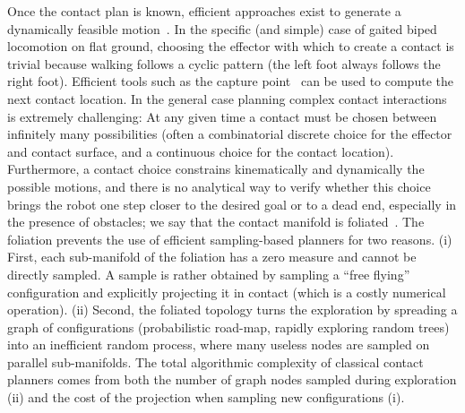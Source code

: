 Once the contact plan is known, efficient approaches exist to generate a dynamically feasible motion~\citep{Carpentier2016}.
In the specific (and simple) case of gaited biped locomotion on flat ground, 
choosing the effector with which to create a contact is trivial because walking follows a cyclic pattern (the left foot always follows the right foot).
Efficient tools such as the capture point~\citep{Pratt2006} can be used to compute the next contact location.
In the general case planning complex contact interactions is extremely challenging:
At any given time a contact must be chosen between infinitely many possibilities (often a combinatorial discrete choice for the effector and contact surface, and a continuous choice for the contact location). Furthermore, a contact choice constrains kinematically and dynamically the possible motions, and there is no analytical way to verify whether this choice brings the robot one step closer to the desired goal or to a dead end, especially in the presence of obstacles; we say that the contact manifold is foliated~\citep{simeon-manipulation-04}. 
The
foliation prevents the use of efficient sampling-based
planners
for two reasons. (i) First, each sub-manifold of the         
foliation
has
a zero measure and cannot be directly sampled.         
A
sample
is
rather obtained by sampling a “free flying”         
configuration
and
explicitly projecting it in contact (which is a         
costly
numerical
operation).
(ii) Second, the foliated topology       
turns
the
exploration
by
spreading
a graph of configurations        
(probabilistic
road-map,
rapidly
exploring
random trees) into      
an
inefficient
random
process,
where
many
useless nodes       
are
sampled
on
parallel
sub-manifolds.
The
total
algorithmic       
complexity
of
classical
contact
planners
comes
from
both the        
number
of
graph
nodes
sampled
during
exploration
(ii) and
the cost of the projection when sampling new configurations
(i).

